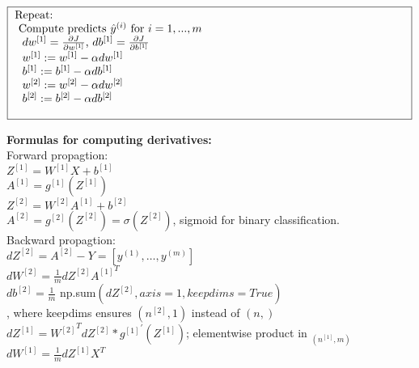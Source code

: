 \documentclass{article}
\begin{document}
$\noindent\fbox{
\parbox{\textwidth}{

Repeat:\\
$\indent$ Compute predicts ${\hat{y}}^{(i)}$ for $i=1,...,m$\\
$\indent$ $\indent$ $dw^{[1]} = \frac{\partial J}{\partial w^{[1]}}$, $db^{[1]} = \frac{\partial J}{\partial b^{[1]}}$\\
$\indent$ $\indent$ $w^{[1]} := w^{[1]} -\alpha dw^{[1]}$\\
$\indent$ $\indent$ $b^{[1]} := b^{[1]} -\alpha db^{[1]}$\\
$\indent$ $\indent$ $w^{[2]} := w^{[2]} -\alpha dw^{[2]}$\\
$\indent$ $\indent$ $b^{[2]} := b^{[2]} -\alpha db^{[2]}$\\

}
}$\\

\newpage

\textbf{Formulas for computing derivatives:}\\

Forward propagtion:\\

$Z^{[1]} = W^{[1]} X + b^{[1]}$\\

$A^{[1]} = g^{[1]}(Z^{[1]})$\\

$Z^{[2]} = W^{[2]} A^{[1]} + b^{[2]}$\\

$A^{[2]} = g^{[2]}(Z^{[2]}) = \sigma(Z^{[2]})$, sigmoid for binary classification.\\


Backward propagtion:\\

$dZ^{[2]} = A^{[2]} - Y = [y^{(1)}, \dots,y^{(m)}]$\\

$dW^{[2]} = \frac{1}{m}dZ^{[2]} {A^{[1]}}^T$\\

$db^{[2]} = \frac{1}{m}$ np.sum$(dZ^{[2]}, axis=1, keepdims=True)$\\

    , where keepdims ensures $(n^{[2]}, 1)$ instead of $(n,)$\\

$dZ^{[1]} ={W^{[2]}}^T dZ^{[2]} * {g^{[1]}}^{'} (Z^{[1]})$; elementwise product in $_{(n^{[1]}, m)}$\\

$dW^{[1]} = \frac{1}{m}dZ^{[1]}X^T$\\
\end{document}
